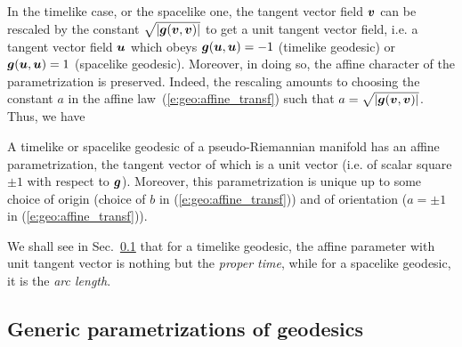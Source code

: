 In the timelike case, or the spacelike one,
the tangent vector field $\bm{v}$ can be rescaled by the constant $\sqrt{|\bm{g}(\bm{v},\bm{v})|}$ to get
a unit tangent vector field, i.e. a tangent vector field $\bm{u}$ which obeys
$\bm{g}(\bm{u},\bm{u}) = -1$ (timelike geodesic) or $\bm{g}(\bm{u},\bm{u}) = 1$
(spacelike geodesic). Moreover, in doing so, the affine character of the
parametrization is preserved. Indeed, the rescaling amounts to choosing the constant $a$
in the affine law~(\ref{e:geo:affine_transf}) such that $a = \sqrt{|\bm{g}(\bm{v},\bm{v})|}$.
Thus, we have
\begin{prop}
A timelike or spacelike geodesic of a pseudo-Riemannian manifold has an affine parametrization,
the tangent vector of which is a unit vector (i.e. of scalar square $\pm 1$ with respect to
$\bm{g}$). Moreover, this parametrization is unique up to some choice of origin
(choice of $b$ in (\ref{e:geo:affine_transf})) and of
orientation ($a=\pm 1$ in (\ref{e:geo:affine_transf})).
\end{prop}
We shall see in Sec.~\ref{s:geo:gener_param} that for a timelike geodesic,
the affine parameter with unit tangent vector is nothing but the
\emph{proper time}, while for a spacelike
geodesic, it is the \emph{arc length}.

\subsection{Generic parametrizations of geodesics} \label{s:geo:gener_param}

